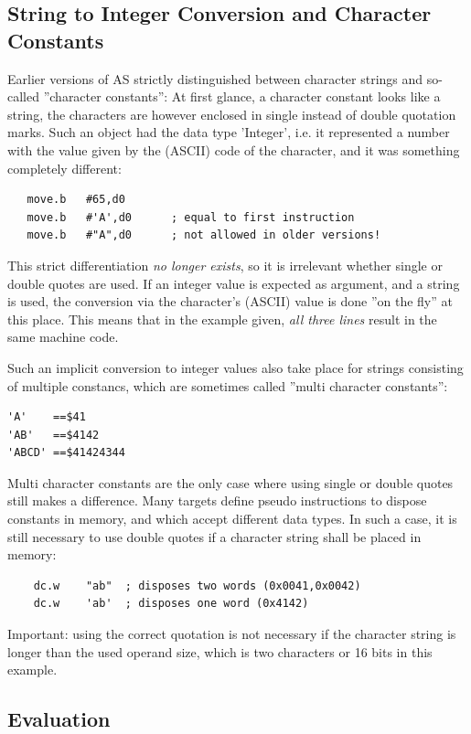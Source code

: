 \documentclass[12pt,twoside]{report}
\newcommand{\asname}{{AS}}
\begin{document}
\subsection{String to Integer Conversion and Character Constants}

Earlier versions of \asname{} strictly distinguished between character
strings and so-called ''character constants'': At first glance, a
character constant looks like a string, the characters are however
enclosed in single instead of double quotation marks.  Such an object had
the data type 'Integer', i.e. it represented a number with the value
given by the (ASCII) code of the character, and it was something
completely different:

\begin{verbatim}
   move.b   #65,d0
   move.b   #'A',d0      ; equal to first instruction
   move.b   #"A",d0      ; not allowed in older versions!
\end{verbatim}

This strict differentiation {\em no longer exists}, so it is irrelevant
whether single or double quotes are used.  If an integer value
is expected as argument, and a string is used, the conversion via the
character's (ASCII) value is done ''on the fly'' at this place. This
means that in the example given, {\em all three lines} result in the
same machine code.

Such an implicit conversion to integer values also take place for strings
consisting of multiple constancs, which are sometimes called ''multi
character constants'':
\begin{verbatim}
'A'    ==$41
'AB'   ==$4142
'ABCD' ==$41424344
\end{verbatim}
Multi character constants are the only case where using single or double
quotes still makes a difference.  Many targets define pseudo instructions
to dispose constants in memory, and which accept different data types.
In such a case, it is still necessary to use double quotes if a character
string shall be placed in memory:
\begin{verbatim}
    dc.w    "ab"  ; disposes two words (0x0041,0x0042)
    dc.w    'ab'  ; disposes one word (0x4142)
\end{verbatim}
Important: using the correct quotation is not necessary if the character
string is longer than the used operand size, which is two characters or
16 bits in this example.

\subsection{Evaluation}
\end{document}
